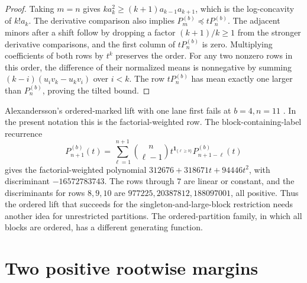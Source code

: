 \documentclass[11pt]{article}
\begin{document}
\begin{proof}
Taking \(m=n\) gives \(k a_k^2\ge(k+1)a_{k-1}a_{k+1}\), which is the log-concavity of \(k!a_k\). The derivative comparison also implies \(P^{(b)}_m\preceq tP^{(b)}_n\). The adjacent minors after a shift follow by dropping a factor \((k+1)/k\ge1\) from the stronger derivative comparisons, and the first column of \(tP^{(b)}_n\) is zero. Multiplying coefficients of both rows by \(t^k\) preserves the order. For any two nonzero rows in this order, the difference of their normalized means is nonnegative by summing \((k-i)(u_i v_k-u_k v_i)\) over \(i<k\). The row \(tP^{(b)}_n\) has mean exactly one larger than \(P^{(b)}_n\), proving the tilted bound.
\end{proof}

Alexandersson's ordered-marked lift with one lane first fails at \(b=4,n=11\) \cite{rrfinite}. In the present notation this is the factorial-weighted row. The block-containing-label recurrence
\[
 P^{(b)}_{n+1}(t)=
    \sum_{\ell=1}^{n+1}\binom{n}{\ell-1}
         t^{\mathbf 1_{\{\ell\ge b\}}}P^{(b)}_{n+1-\ell}(t)
\]
gives the factorial-weighted polynomial
\(312676+318671t+94446t^2\), with discriminant \(-16572783743\).
The rows through \(7\) are linear or constant, and the discriminants for rows \(8,9,10\) are \(977225,20387812,188097001\), all positive. Thus the ordered lift that succeeds for the singleton-and-large-block restriction \cite{symcatsp} needs another idea for unrestricted partitions. The ordered-partition family, in which all blocks are ordered, has a different generating function.

\appendix
\section{Two positive rootwise margins}\label{sec:hankel}
\end{document}
